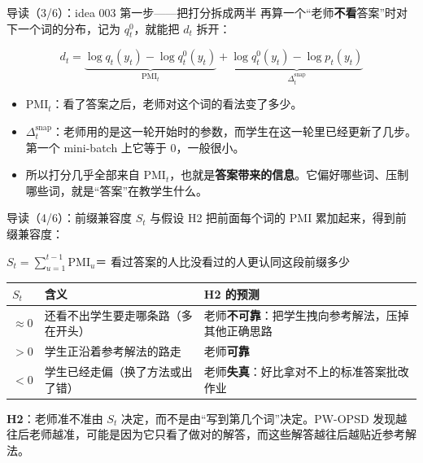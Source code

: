 \documentclass[aspectratio=169,11pt]{beamer}
\newcommand{\hl}[1]{{\color{accent}#1}}
\begin{document}
\begin{frame}{导读（3/6）：idea 003 第一步——把打分拆成两半}
再算一个“老师\textbf{不看}答案”时对下一个词的分布，记为 $q^0_t$，就能把 $d_t$ 拆开：
\begin{eqbox}
\[
d_t=\underbrace{\log q_t(y_t)-\log q^0_t(y_t)}_{\textstyle\mathrm{PMI}_t}
+\underbrace{\log q^0_t(y_t)-\log p_t(y_t)}_{\textstyle\Delta^{\mathrm{snap}}_t}
\]
\end{eqbox}
\begin{itemize}
  \setlength\itemsep{4pt}
  \item $\mathrm{PMI}_t$：看了答案之后，老师对这个词的看法变了多少。
  \item $\Delta^{\mathrm{snap}}_t$：老师用的是这一轮开始时的参数，而学生在这一轮里已经更新了几步。第一个 mini-batch 上它等于 0，一般很小。
  \item 所以打分几乎全部来自 $\mathrm{PMI}_t$，也就是\hl{\textbf{答案带来的信息}}。它偏好哪些词、压制哪些词，就是“答案”在教学生什么。
\end{itemize}
\end{frame}

\begin{frame}{导读（4/6）：前缀兼容度 $S_t$ 与假设 H2}
把前面每个词的 $\mathrm{PMI}$ 累加起来，得到前缀兼容度：
\begin{eqbox}
\centering $S_t=\sum_{u=1}^{t-1}\mathrm{PMI}_u$\quad ＝ 看过答案的人比没看过的人更认同这段前缀多少
\end{eqbox}
\footnotesize
\setlength{\tabcolsep}{4pt}\renewcommand{\arraystretch}{1.2}
\begin{tabularx}{\linewidth}{@{}>{\centering\arraybackslash}p{1.1cm} >{\raggedright\arraybackslash}p{5.4cm} Y@{}}
\toprule
$S_t$ & 含义 & H2 的预测\\
\midrule
$\approx0$ & 还看不出学生要走哪条路（多在开头） & 老师\textbf{不可靠}：把学生拽向参考解法，压掉其他正确思路\\
$>0$ & 学生正沿着参考解法的路走 & 老师\textbf{可靠}\\
$<0$ & 学生已经走偏（换了方法或出了错） & 老师\textbf{失真}：好比拿对不上的标准答案批改作业\\
\bottomrule
\end{tabularx}
\par\vspace{4pt}
\small\textbf{H2}：老师准不准由 $S_t$ 决定，而不是由“写到第几个词”决定。PW-OPSD 发现越往后老师越准，可能是因为它只看了做对的解答，而这些解答越往后越贴近参考解法。
\end{frame}
\end{document}
